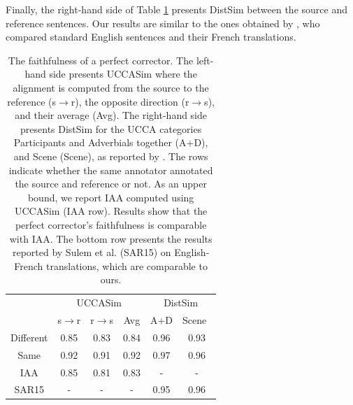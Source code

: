 \documentclass[letterpaper, 11pt]{article}
\begin{document}
%

Finally, the right-hand side of Table \ref{tab:Distances} presents {\sc DistSim}
between the source and reference sentences.
Our results are similar to the ones obtained by ,
who compared standard English sentences and their French translations.
\begin{table}
	\vspace{-0.5cm}
  \small
  \centering
  \singlespacing
  \begin{tabular}{c|c|c|c||c|c|}
  	\cline{2-6} 
  	& \multicolumn{3}{c||}{\sc UCCASim} & \multicolumn{2}{c|}{\sc DistSim}\\ \cline{2-6}
  	& s$\rightarrow$r & r$\rightarrow$s & Avg & A+D & Scene\
    \\
    \hline
    Different & 0.85 & 0.83 & 0.84 & 0.96 & 0.93
    \\
    Same & 0.92 & 0.91 & 0.92 & 0.97 & 0.96
    \\
    \hline
    \hline
    IAA & 0.85 & 0.81 & 0.83 & - & -
    \\
    \hline
    SAR15 & - & - & - & 0.95 & 0.96 \\
    \hline
  \end{tabular}
  \caption{\label{tab:Distances}
    The faithfulness of a perfect corrector. The left-hand side presents {\sc UCCASim}
    where the alignment is computed from the source to the reference (s$\rightarrow$r), the opposite direction
    (r$\rightarrow$s), and their average (Avg).
    The right-hand side presents {\sc DistSim} for the UCCA categories Participants and Adverbials
    together (A+D), and Scene (Scene), as reported by \newcite{sulem2015conceptual}.
    The rows indicate whether the same annotator annotated the source and reference or not. As an upper bound, we report IAA computed using {\sc UCCASim} (IAA row).
    Results show that the perfect corrector's faithfulness is comparable with IAA.
    The bottom row presents the results reported by Sulem et al. (SAR15) on English-French
    translations, which are comparable to ours.}
\vspace{-0.6cm}
\end{table}
\end{document}
